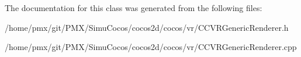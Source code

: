 The documentation for this class was generated from the following files\+:\begin{DoxyCompactItemize}
\item 
/home/pmx/git/\+P\+M\+X/\+Simu\+Cocos/cocos2d/cocos/vr/C\+C\+V\+R\+Generic\+Renderer.\+h\item 
/home/pmx/git/\+P\+M\+X/\+Simu\+Cocos/cocos2d/cocos/vr/C\+C\+V\+R\+Generic\+Renderer.\+cpp\end{DoxyCompactItemize}
